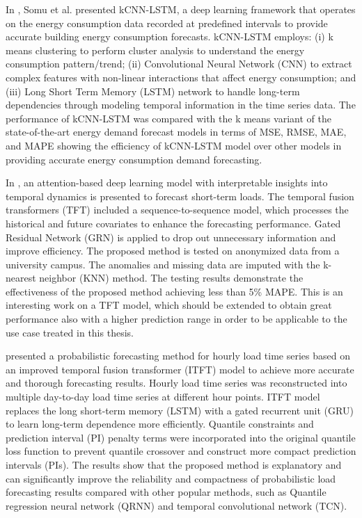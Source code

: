 In \cite{SOMU2021110591}, Somu et al. presented kCNN-LSTM, a deep learning framework that operates on the energy consumption data recorded at predefined intervals to provide accurate building energy consumption forecasts.
kCNN-LSTM employs:
(i) k means clustering to perform cluster analysis to understand the energy consumption pattern\slash trend;
(ii) Convolutional Neural Network (CNN) to extract complex features with non-linear interactions that affect energy consumption;
and (iii) Long Short Term Memory (LSTM) network to handle long-term dependencies through modeling temporal information in the time series data.
The performance of kCNN-LSTM was compared with the k means variant of the state-of-the-art energy demand forecast models in terms of MSE, RMSE, MAE, and MAPE showing the efficiency of kCNN-LSTM model over other models in providing accurate energy consumption demand forecasting.

In \cite{10033079}, an attention-based deep learning model with interpretable insights into temporal dynamics is presented to forecast short-term loads.
The temporal fusion transformers (TFT) included a sequence-to-sequence model, which processes the historical and future covariates to enhance the forecasting performance.
Gated Residual Network (GRN) is applied to drop out unnecessary information and improve efficiency.
The proposed method is tested on anonymized data from a university campus.
The anomalies and missing data are imputed with the k-nearest neighbor (KNN) method.
The testing results demonstrate the effectiveness of the proposed method achieving less than 5\% MAPE.
This is an interesting work on a TFT model, which should be extended to obtain great performance also with a higher prediction range in order to be applicable to the use case treated in this thesis.

\cite{LI2023108743} presented a probabilistic forecasting method for hourly load time series based on an improved temporal fusion transformer (ITFT) model to achieve more accurate and thorough forecasting results.
Hourly load time series was reconstructed into multiple day-to-day load time series at different hour points.
ITFT model replaces the long short-term memory (LSTM) with a gated recurrent unit (GRU) to learn long-term dependence more efficiently.
Quantile constraints and prediction interval (PI) penalty terms were incorporated into the original quantile loss function to prevent quantile crossover and construct more compact prediction intervals (PIs).
The results show that the proposed method is explanatory and can significantly improve the reliability and compactness of probabilistic load forecasting results compared with other popular methods, such as Quantile regression neural network (QRNN) and temporal convolutional network (TCN).


